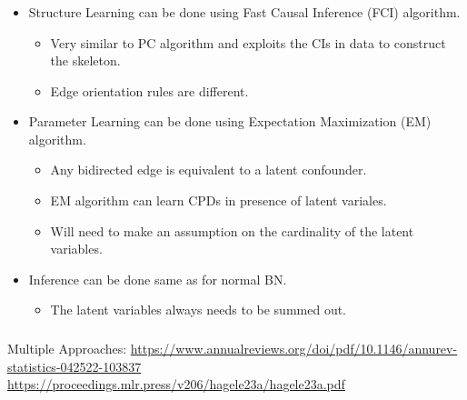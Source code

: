 \documentclass{beamer}
\begin{document}
\begin{frame}
	\frametitle{}
	\begin{itemize}
		\item Structure Learning can be done using Fast Causal Inference (FCI) algorithm.
			\begin{itemize}
				\item Very similar to PC algorithm and exploits the CIs in data to construct the skeleton.
				\item Edge orientation rules are different.
			\end{itemize}
		\item Parameter Learning can be done using Expectation Maximization (EM) algorithm.
			\begin{itemize}
				\item Any bidirected edge is equivalent to a latent confounder.
				\item EM algorithm can learn CPDs in presence of latent variales.
				\item Will need to make an assumption on the cardinality of the latent variables.
			\end{itemize}
		\item Inference can be done same as for normal BN.
			\begin{itemize}
				\item The latent variables always needs to be summed out.
			\end{itemize}
	\end{itemize}
\end{frame}

\begin{frame}
	\frametitle{}
	Multiple Approaches:
	\url{https://www.annualreviews.org/doi/pdf/10.1146/annurev-statistics-042522-103837} \\
	\url{https://proceedings.mlr.press/v206/hagele23a/hagele23a.pdf}
\end{frame}
\end{document}
